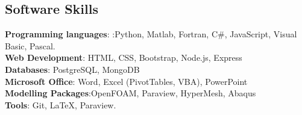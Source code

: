 \documentclass[line]{res}
\newenvironment{p11}
{\begin{adjustwidth}{-25pt}{0pt}
\vspace{8pt}}
{\end{adjustwidth}}
\begin{document}
\begin{resume}



\section{Software Skills}
\begin{p11}
\textbf{Programming languages}: :Python, Matlab, Fortran, C#,  JavaScript, Visual Basic, Pascal.\\
\textbf{Web Development}: HTML, CSS, Bootstrap, Node.js, Express\\
\textbf{Databases}: PostgreSQL, MongoDB\\
\textbf{Microsoft Office}:  Word, Excel (PivotTables, VBA), PowerPoint\\
\textbf{Modelling Packages}:OpenFOAM, Paraview, HyperMesh, Abaqus\\
\vspace{4pt}
\textbf{Tools}: Git, \LaTeX,  Paraview.


\end{p11}
\end{resume}
\end{document}
